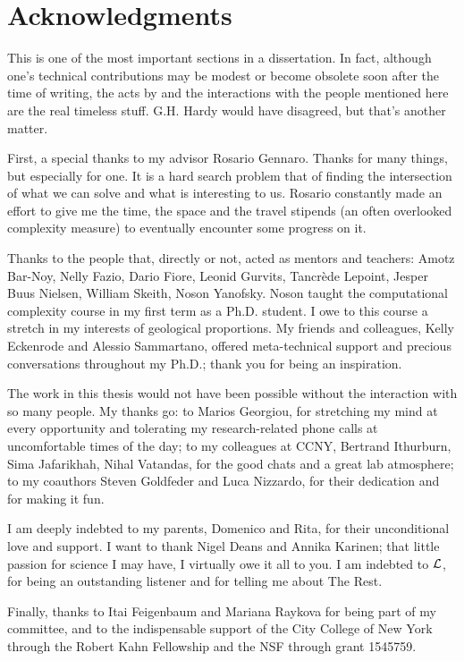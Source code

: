 \chapter*{Acknowledgments}


This is one of the most important sections in a dissertation. In fact, although one's technical contributions may be modest or become obsolete soon after the time of writing, the acts by and the interactions with the people mentioned here are the real timeless stuff. G.H. Hardy would have disagreed, but that's another matter.

First, a special thanks to my advisor Rosario Gennaro. Thanks for many things, but especially for one. It is a hard search problem that of finding the intersection of what we can solve and what is interesting to us. Rosario constantly made an effort to give me the time,  the space and the travel stipends (an often overlooked complexity measure) to eventually encounter some progress on it. 

Thanks to the people that, directly or not, acted as mentors and teachers: Amotz Bar-Noy, Nelly Fazio, Dario Fiore, Leonid Gurvits, Tancr\`ede Lepoint, Jesper Buus Nielsen, William Skeith, Noson Yanofsky. Noson taught the computational complexity course in my first term as a Ph.D. student. I owe to this course a stretch in my interests of geological proportions. My friends and colleagues, Kelly Eckenrode and Alessio Sammartano, offered meta-technical support and precious conversations throughout my Ph.D.; thank you for being an inspiration.

The work in this thesis would not have been possible without the interaction with so many people. My thanks go: to Marios Georgiou, for stretching my mind at every opportunity and tolerating my research-related phone calls at uncomfortable times of the day;
to my colleagues at CCNY, Bertrand Ithurburn, Sima Jafarikhah, Nihal Vatandas, for the good chats and a great lab atmosphere; 
to my coauthors Steven Goldfeder and Luca Nizzardo, for their dedication and for making it fun. 

I am deeply indebted to my parents, Domenico and Rita, for their unconditional love and support. I want to thank Nigel Deans and Annika Karinen; that little passion for science I may have, I virtually owe it all to you. I am indebted to $\cal{L}$, for being an outstanding listener and for telling me about The Rest. 

Finally, thanks to Itai Feigenbaum and Mariana Raykova for being part of my committee, and to the indispensable support of the City College of New York through the Robert Kahn Fellowship and the NSF through grant 1545759.